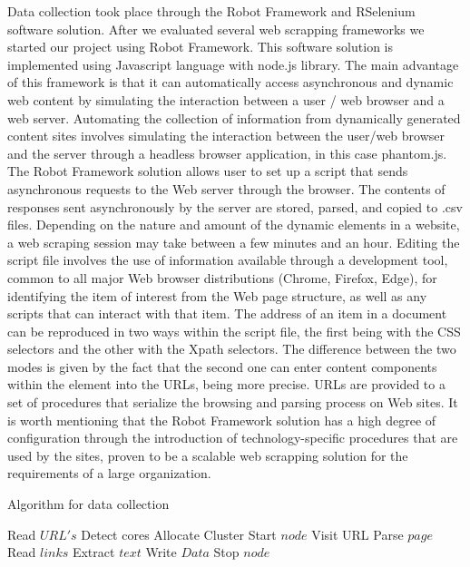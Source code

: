 \documentclass[]{article}
\begin{document}
Data collection took place through the Robot Framework and RSelenium software solution. 
After we evaluated several web scrapping frameworks we started our project using Robot Framework. This software solution is implemented using Javascript language with node.js library.
The main advantage of this framework is that it can automatically access asynchronous and dynamic web content by simulating the interaction between a user / web browser and a web server. Automating the collection of information from dynamically generated content sites involves simulating the interaction between the user/web browser and the server through a headless browser application, in this case phantom.js. The Robot Framework solution allows user to set up a script that sends asynchronous requests to the Web server through the browser. The contents of responses sent asynchronously by the server are stored, parsed, and copied to .csv files. Depending on the nature and amount of the dynamic elements in a website, a web scraping session may take between a few minutes and an hour.
Editing the script file involves the use of information available through a development tool, common to all major Web browser distributions (Chrome, Firefox, Edge), for identifying the item of interest from the Web page structure, as well as any scripts that can interact with that item. The address of an item in a document can be reproduced in two ways within the script file, the first being with the CSS selectors and the other with the Xpath selectors. The difference between the two modes is given by the fact that the second one can enter content components within the element into the URLs, being more precise. URLs are provided to a set of procedures that serialize the browsing and parsing process on Web sites. It is worth mentioning that the Robot Framework solution has a high degree of configuration through the introduction of technology-specific procedures that are used by the sites, proven to be a scalable web scrapping solution for the requirements of a large organization.


\begin{algorithm}[h]
	\caption{Algorithm for data collection}
	\label{alg:dc}
	\begin{algorithmic}
		\STATE Read $URL's$
		\STATE Detect cores
		\STATE Allocate Cluster
		 \STATE Start $node$
		 	\STATE Visit URL
		 			\STATE{}
		 		\ELSE
		 			\STATE Parse $page$
		 			\STATE Read $links$
		 			\STATE Extract $text$
		 			\STATE{}
		 		\ENDIF
				\STATE Write $Data$
			\STATE Stop $node$
		\ENDFOR		
	\end{algorithmic}
\end{algorithm}
\end{document}
